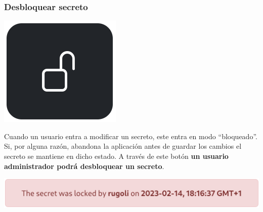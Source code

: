 \documentclass{\ClassPath/viu-tfm-template}
\begin{document}
\subsubsection*{Desbloquear secreto}
{
\begin{minipage}{0.1\linewidth}
    \includegraphics[width=\linewidth]{img/unlock.png}
\end{minipage}
\hspace{0.5cm}
\begin{minipage}{0.9\linewidth}
    Cuando un usuario entra a modificar un secreto, este entra en modo “bloqueado”. Si, por alguna razón, abandona la aplicación antes de guardar los cambios el secreto se mantiene en dicho estado. A través de este botón \textbf{un usuario administrador podrá desbloquear un secreto}.
\end{minipage}
}

\begin{center}
    \includegraphics[width=0.8\linewidth]{img/unlock_warning.png}
\end{center}
\end{document}
